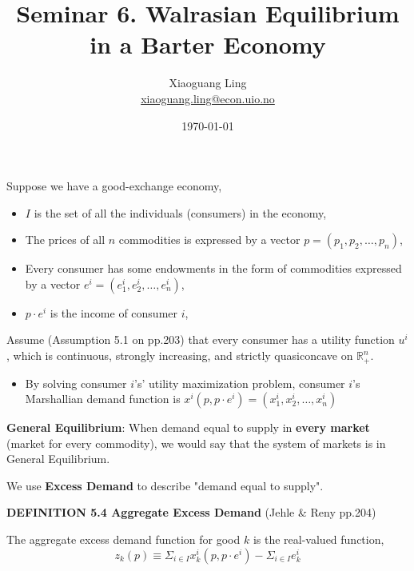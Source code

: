 \documentclass{article}
\title{Seminar 6. Walrasian Equilibrium in a Barter Economy}
\author{Xiaoguang Ling \\  \href{xiaoguang.ling@econ.uio.no}{xiaoguang.ling@econ.uio.no}}
\date{\today}
\newcommand{\R}{\mathbb{R}}
\begin{document}
\maketitle





\begin{mdframed}[backgroundcolor=blue!20,linecolor=white]

Suppose we have a good-exchange economy,

\begin{itemize}
\item $I$ is the set of all the individuals (consumers) in the economy,
\item The prices of all $n$ commodities is expressed by a vector $p = (p_1, p_2, \dots, p_n)$,
\item Every consumer has some endowments in the form of commodities expressed by a vector $e^i = (e^i_1,e^i_2,\dots,e^i_n)$,
\item $p\cdot e^i$ is the income of consumer $i$,
\end{itemize}

Assume (Assumption 5.1 on pp.203) that every consumer has a utility function $u^i$, which is continuous, strongly increasing, and strictly quasiconcave on $\R^n_{+}$.

\begin{itemize}
\item By solving consumer $i$'s' utility maximization problem, consumer $i$'s Marshallian demand function is $x^i(p,p\cdot e^i) = (x^i_1,x^i_2,\dots,x^i_n)$
\end{itemize}

\textbf{General Equilibrium}: When demand equal to supply in \textbf{every market} (market for every commodity), we would say that the system of markets is in General Equilibrium.

\vspace{2mm}

We use \textbf{Excess Demand} to describe "demand equal to supply".
\vspace{2mm}

\textbf{DEFINITION 5.4 Aggregate Excess Demand} (Jehle \& Reny pp.204)

The aggregate excess demand function for good $k$ is the real-valued function,
$$z_k(p) \equiv \Sigma_{i \in I } x^i_k(p,p\cdot e^i) - \Sigma_{i \in I } e^i_k$$


\end{mdframed}
\end{document}
